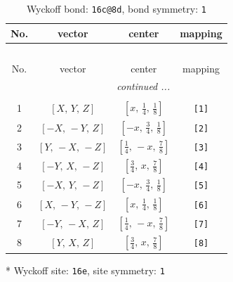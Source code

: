 \documentclass[fleqn,8pt]{jsarticle}
\begin{document}
\renewcommand{\arraystretch}{1.2}
\begin{longtable}{cccc}
\caption{Wyckoff bond: {\tt 16c@8d}, bond symmetry: {\tt 1}}
 \\
 \hline \hline
No. & vector & center & mapping \\ \hline \endfirsthead

\multicolumn{3}{l}{\tablename\ \thetable{}} \\
 \hline \hline
No. & vector & center & mapping \\ \hline \endhead

 \hline \hline
\multicolumn{3}{r}{\footnotesize\it continued ...} \\ \endfoot

 \hline \hline
\multicolumn{3}{r}{} \\ \endlastfoot

1 & $\left[ X,\, Y,\, Z \right]$ & $\left[ x,\, \frac{1}{4},\, \frac{1}{8} \right]$ & {\tt [1]} \\ \hline
2 & $\left[ - X,\, - Y,\, Z \right]$ & $\left[ - x,\, \frac{3}{4},\, \frac{1}{8} \right]$ & {\tt [2]} \\ \hline
3 & $\left[ Y,\, - X,\, - Z \right]$ & $\left[ \frac{1}{4},\, - x,\, \frac{7}{8} \right]$ & {\tt [3]} \\ \hline
4 & $\left[ - Y,\, X,\, - Z \right]$ & $\left[ \frac{3}{4},\, x,\, \frac{7}{8} \right]$ & {\tt [4]} \\ \hline
5 & $\left[ - X,\, Y,\, - Z \right]$ & $\left[ - x,\, \frac{3}{4},\, \frac{1}{8} \right]$ & {\tt [5]} \\ \hline
6 & $\left[ X,\, - Y,\, - Z \right]$ & $\left[ x,\, \frac{1}{4},\, \frac{1}{8} \right]$ & {\tt [6]} \\ \hline
7 & $\left[ - Y,\, - X,\, Z \right]$ & $\left[ \frac{1}{4},\, - x,\, \frac{7}{8} \right]$ & {\tt [7]} \\ \hline
8 & $\left[ Y,\, X,\, Z \right]$ & $\left[ \frac{3}{4},\, x,\, \frac{7}{8} \right]$ & {\tt [8]} \\
\end{longtable}
* Wyckoff site: {\tt 16e}, site symmetry: {\tt 1}
\renewcommand{\arraystretch}{1.2}
\end{document}
